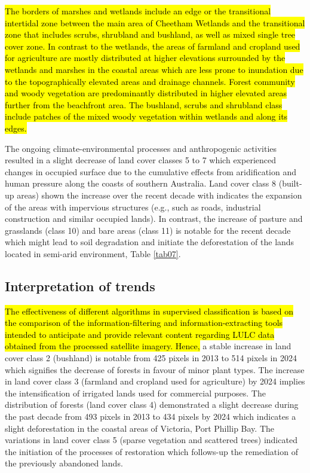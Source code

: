 \documentclass[jmse,article,submit,pdftex,moreauthors]{Definitions/mdpi}
\begin{document}
\hl{The borders of marshes and wetlands include an edge or the transitional intertidal zone between the main area of Cheetham Wetlands and the transitional zone that includes scrubs, shrubland and bushland, as well as mixed single tree cover zone. In contrast to the wetlands, the areas of farmland and cropland used for agriculture are mostly distributed at higher elevations surrounded by the wetlands and marshes in the coastal areas which are less prone to inundation due to the topographically elevated areas and drainage channels. Forest community and woody vegetation are predominantly distributed in higher elevated areas further from the beachfront area. The bushland, scrubs and shrubland class include patches of the mixed woody vegetation within wetlands and along its edges.}

The ongoing climate-environmental processes and anthropogenic activities resulted in a slight decrease of land cover classes 5 to 7 which experienced changes in occupied surface due to the cumulative effects from aridification and human pressure along the coasts of southern Australia. Land cover class 8 (built-up areas) shown the increase over the recent decade with indicates the expansion of the areas with impervious structures (e.g., such as roads, industrial construction and similar occupied lands). In contrast, the increase of pasture and grasslands (class 10) and bare areas (class 11) is notable for the recent decade which might lead to soil degradation and initiate the deforestation of the lands located in semi-arid environment, Table \ref{tab07}. 

\subsection{Interpretation of trends}
\hl{The effectiveness of different algorithms in supervised classification is based on the comparison of the information-filtering and information-extracting tools intended to anticipate  and provide relevant content regarding LULC data obtained from the processed satellite imagery. Hence, }a stable increase in land cover class 2 (bushland) is notable from 425 pixels in 2013 to 514 pixels in 2024 which signifies the decrease of forests in favour of minor plant types. The increase in land cover class 3 (farmland and cropland used for agriculture) by 2024 implies the intensification of irrigated lands used for commercial purposes. The distribution of forests (land cover class 4) demonstrated a slight decrease during the past decade from 493 pixels in 2013 to 434 pixels by 2024 which indicates a slight deforestation in the coastal areas of Victoria, Port Phillip Bay. The variations in land cover class 5 (sparse vegetation and scattered trees) indicated the initiation of the processes of restoration which follows-up the remediation of the previously abandoned lands. 
\end{document}
